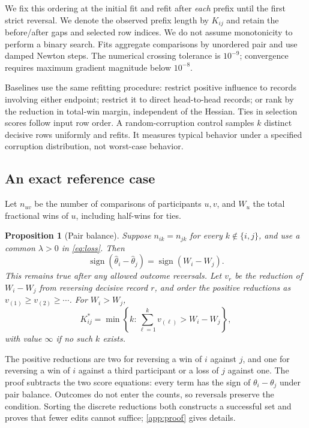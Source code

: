 \documentclass{article}
\newtheorem{proposition}{Proposition}
\begin{document}
We fix this ordering at the initial fit and refit after \emph{each} prefix until the first strict reversal. We denote the observed prefix length by $K_{ij}$ and retain the before/after gaps and selected row indices. We do not assume monotonicity to perform a binary search. Fits aggregate comparisons by unordered pair and use damped Newton steps. The numerical crossing tolerance is $10^{-9}$; convergence requires maximum gradient magnitude below $10^{-8}$.

Baselines use the same refitting procedure: restrict positive influence to records involving either endpoint; restrict it to direct head-to-head records; or rank by the reduction in total-win margin, independent of the Hessian. Ties in selection scores follow input row order. A random-corruption control samples $k$ distinct decisive rows uniformly and refits. It measures typical behavior under a specified corruption distribution, not worst-case behavior.

\subsection{An exact reference case}
Let $n_{uv}$ be the number of comparisons of participants $u,v$, and $W_u$ the total fractional wins of $u$, including half-wins for ties.
\begin{proposition}[Pair balance]\label{prop:balance}
Suppose $n_{ik}=n_{jk}$ for every $k\notin\{i,j\}$, and use a common $\lambda>0$ in \cref{eq:loss}. Then
\[
 \operatorname{sign}(\hat\theta_i-\hat\theta_j)
 =\operatorname{sign}(W_i-W_j).
\]
This remains true after any allowed outcome reversals. Let $v_r$ be the reduction of $W_i-W_j$ from reversing decisive record $r$, and order the positive reductions as $v_{(1)}\ge v_{(2)}\ge\cdots$. For $W_i>W_j$,
\begin{equation}\label{eq:exact}
 K^*_{ij}=\min\left\{k:\sum_{\ell=1}^k v_{(\ell)}>W_i-W_j\right\},
\end{equation}
with value $\infty$ if no such $k$ exists.
\end{proposition}
The positive reductions are two for reversing a win of $i$ against $j$, and one for reversing a win of $i$ against a third participant or a loss of $j$ against one. The proof subtracts the two score equations: every term has the sign of $\theta_i-\theta_j$ under pair balance. Outcomes do not enter the counts, so reversals preserve the condition. Sorting the discrete reductions both constructs a successful set and proves that fewer edits cannot suffice; \cref{app:proof} gives details.
\end{document}
